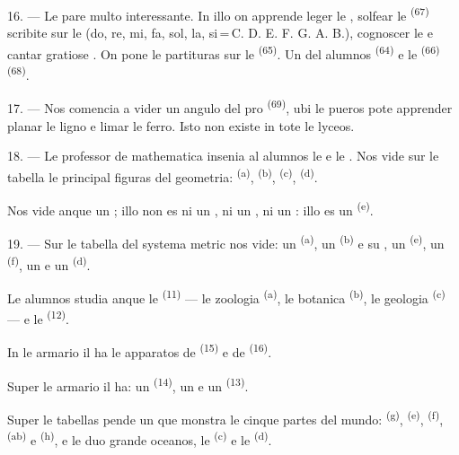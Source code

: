16. --- Le  pare multo interessante. In illo on apprende
leger le , solfear le 
\textsuperscript{(67)} scribite sur le  (do, re, mi, fa,
sol, la, si\,=\,C. D. E. F. G. A. B.), cognoscer le  e cantar
gratiose . On pone le partituras sur le 
\textsuperscript{(65)}. Un del alumnos 
\textsuperscript{(64)} e le  \textsuperscript{(66)}
 \textsuperscript{(68)}.

17. --- Nos comencia a vider un angulo del  pro  \textsuperscript{(69)}, ubi le pueros pote apprender planar le ligno e
limar le ferro. Isto non existe in tote le lyceos.

\VUsaut{5.0mm}
\VUsaut{3.6mm}

18. --- Le professor de mathematica insenia al alumnos le  e le . Nos vide sur le tabella
le principal figuras del geometria:  \textsuperscript{(a)},
 \textsuperscript{(b)}, 
\textsuperscript{(c)},  \textsuperscript{(d)}.

Nos vide anque un ; illo non es ni un , ni un
, ni un : illo es un
 \textsuperscript{(e)}.

19. --- Sur le tabella del systema metric nos vide: un 
\textsuperscript{(a)}, un  \textsuperscript{(b)} e su
, un  \textsuperscript{(e)}, un 
\textsuperscript{(f)}, un  e un 
\textsuperscript{(d)}.

Le alumnos studia anque le  \textsuperscript{(11)} ---
le zoologia \textsuperscript{(a)}, le botanica \textsuperscript{(b)}, le
geologia \textsuperscript{(c)} --- e le 
\textsuperscript{(12)}.

In le armario il ha le apparatos de  \textsuperscript{(15)} e de
 \textsuperscript{(16)}.

Super le armario il ha: un  \textsuperscript{(14)}, un
 e un  \textsuperscript{(13)}.

Super le tabellas pende un  que monstra le cinque partes del
mundo:  \textsuperscript{(g)}, 
\textsuperscript{(e)},  \textsuperscript{(f)}, 
\textsuperscript{(ab)} e  \textsuperscript{(h)}, e le duo grande
oceanos, le  \textsuperscript{(c)} e le 
\textsuperscript{(d)}.
\VUsaut{6.0mm}
\VUfilet{22mm}
